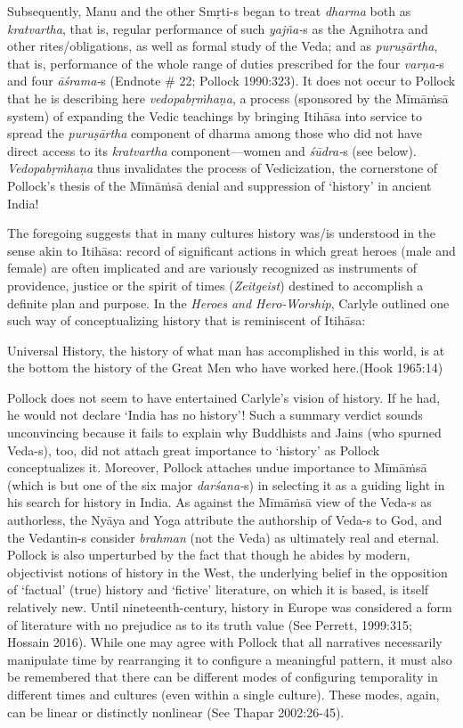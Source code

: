 Subsequently, Manu and the other Smṛti-s began to treat \textit{dharma} both as \textit{kratvartha}, that is, regular performance of such \textit{yajña-}s as the Agnihotra and other rites/obligations, as well as formal study of the Veda; and as \textit{puruṣārtha}, that is, performance of the whole range of duties prescribed for the four \textit{varṇa-}s and four \textit{āśrama-}s (Endnote \# 22; Pollock 1990:323). It does not occur to Pollock that he is describing here \textit{vedopabṛṁhaṇa}, a process (sponsored by the Mīmāṁsā system) of expanding the Vedic teachings by bringing Itihāsa into service to spread the \textit{puruṣārtha} component of dharma among those who did not have direct access to its \textit{kratvartha} component—women and \textit{śūdra-}s (see below). \textit{Vedopabṛṁhaṇa} thus invalidates the process of Vedicization, the cornerstone of Pollock’s thesis of the Mīmāṁsā denial and suppression of ‘history’ in ancient India! 

The foregoing suggests that in many cultures history was/is understood in the sense akin to Itihāsa: record of significant actions in which great heroes (male and female) are often implicated and are variously recognized as instruments of providence, justice or the spirit of times (\textit{Zeitgeist}) destined to accomplish a definite plan and purpose. In the \textit{Heroes and Hero-Worship}, Carlyle outlined one such way of conceptualizing history that is reminiscent of Itihāsa:

\begin{myquote}
Universal History, the history of what man has accomplished in this world, is at the bottom the history of the Great Men who have worked here.\hfill (Hook 1965:14)
\end{myquote}

Pollock does not seem to have entertained Carlyle’s vision of history. If he had, he would not declare ‘India has no history’! Such a summary verdict sounds unconvincing because it fails to explain why Buddhists and Jains (who spurned Veda-s), too, did not attach great importance to ‘history’ as Pollock conceptualizes it. Moreover, Pollock attaches undue importance to Mīmāṁsā (which is but one of the six major \textit{darśana-}s) in selecting it as a guiding light in his search for history in India. As against the Mīmāṁsā view of the Veda-s as authorless, the Nyāya and Yoga attribute the authorship of Veda-s to God, and the Vedantin-s consider \textit{brahman} (not the Veda) as ultimately real and eternal. Pollock is also unperturbed by the fact that though he abides by modern, objectivist notions of history in the West, the underlying belief in the opposition of ‘factual’ (true) history and ‘fictive’ literature, on which it is based, is itself relatively new. Until nineteenth-century, history in Europe was considered a form of literature with no prejudice as to its truth value (See Perrett, 1999:315; Hossain 2016). While one may agree with Pollock that all narratives necessarily manipulate time by rearranging it to configure a meaningful pattern, it must also be remembered that there can be different modes of configuring temporality in different times and cultures (even within a single culture). These modes, again, can be linear or distinctly nonlinear (See Thapar 2002:26-45).


